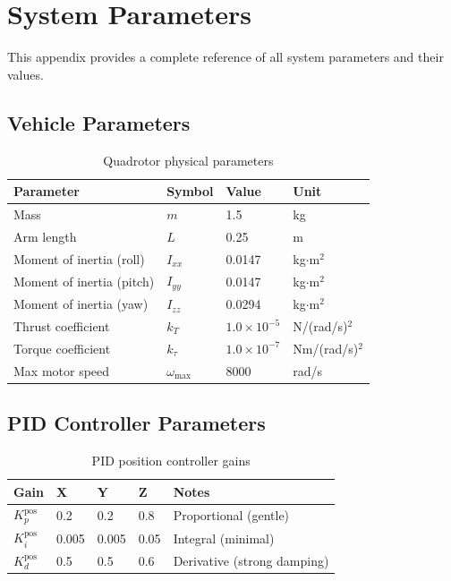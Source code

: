 
\chapter{System Parameters}
\label{app:parameters}

This appendix provides a complete reference of all system parameters and their values.

\section{Vehicle Parameters}

\begin{table}[htbp]
    \centering
    \caption{Quadrotor physical parameters}
    \label{tab:vehicle_params}
    \begin{tabular}{@{}llll@{}}
        \toprule
        \textbf{Parameter} & \textbf{Symbol} & \textbf{Value} & \textbf{Unit} \\
        \midrule
        Mass & $m$ & 1.5 & kg \\
        Arm length & $L$ & 0.25 & m \\
        Moment of inertia (roll) & $I_{xx}$ & 0.0147 & kg$\cdot$m$^2$ \\
        Moment of inertia (pitch) & $I_{yy}$ & 0.0147 & kg$\cdot$m$^2$ \\
        Moment of inertia (yaw) & $I_{zz}$ & 0.0294 & kg$\cdot$m$^2$ \\
        Thrust coefficient & $k_T$ & $1.0 \times 10^{-5}$ & N/(rad/s)$^2$ \\
        Torque coefficient & $k_\tau$ & $1.0 \times 10^{-7}$ & Nm/(rad/s)$^2$ \\
        Max motor speed & $\omega_{\max}$ & 8000 & rad/s \\
        \bottomrule
    \end{tabular}
\end{table}

\section{PID Controller Parameters}

\begin{table}[htbp]
    \centering
    \caption{PID position controller gains}
    \label{tab:pid_pos_gains}
    \begin{tabular}{@{}lllll@{}}
        \toprule
        \textbf{Gain} & \textbf{X} & \textbf{Y} & \textbf{Z} & \textbf{Notes} \\
        \midrule
        $K_p^{\text{pos}}$ & 0.2 & 0.2 & 0.8 & Proportional (gentle) \\
        $K_i^{\text{pos}}$ & 0.005 & 0.005 & 0.05 & Integral (minimal) \\
        $K_d^{\text{pos}}$ & 0.5 & 0.5 & 0.6 & Derivative (strong damping) \\
        \bottomrule
    \end{tabular}
\end{table}

